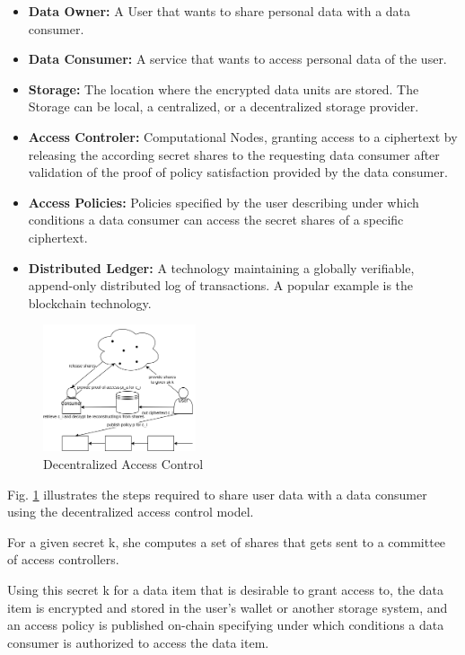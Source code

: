 \documentclass[conference]{IEEEtran}
\begin{document}
\begin{itemize}
  \item \textbf{Data Owner:} A User that wants to share personal data with a data consumer.
  \item \textbf{Data Consumer:} A service that wants to access personal data of the user.
  \item \textbf{Storage:} The location where the encrypted data units are stored.
  The Storage can be local, a centralized, or a decentralized storage provider.
  \item \textbf{Access Controler:} Computational Nodes, granting access to a ciphertext by releasing the according secret shares to the requesting data consumer after validation of the proof of policy satisfaction provided by the data consumer.
  \item \textbf{Access Policies:} Policies specified by the user describing under which conditions a data consumer can access the secret shares of a specific ciphertext.
  \item \textbf{Distributed Ledger:} A technology maintaining a globally verifiable, append-only distributed log of transactions. A popular example is the blockchain technology. 
\end{itemize}

\begin{figure}[htbp]
  \centering
  \includegraphics[width=0.4\textwidth]{figures/decentralized_access_control.png}
  \caption{Decentralized Access Control}
  \label{fig:decentralized_access_control}
\end{figure}
Fig. \ref{fig:decentralized_access_control} illustrates the steps required to share user data with a data consumer using the decentralized access control model.

For a given secret k, she computes a set of shares that gets sent to a committee of access controllers.

Using this secret k for a data item that is desirable to grant access to, the data item is encrypted and stored in the user's wallet or another storage system, and an access policy is published on-chain specifying under which conditions a data consumer is authorized to access the data item.
\end{document}
